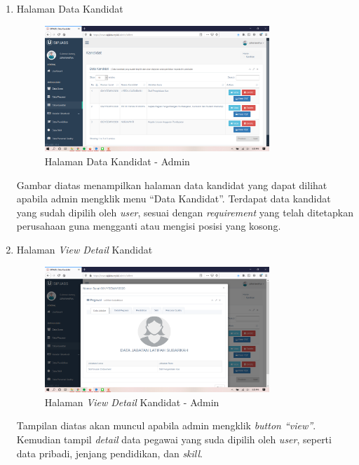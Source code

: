 \begin{enumerate}
	\newpage
		\item Halaman Data Kandidat
	\begin{figure}
		\centering
		\includegraphics[width=0.8\textwidth]
		{pics/admin/implementasi/datatallent.png}
		\caption{Halaman Data Kandidat - Admin}
		\label{fig:CC10}
	\end{figure}
	Gambar diatas menampilkan halaman data kandidat yang dapat dilihat apabila admin mengklik menu “Data Kandidat”. Terdapat data kandidat yang sudah dipilih oleh \textit{user}, sesuai dengan \textit{requirement} yang telah ditetapkan perusahaan guna mengganti atau mengisi posisi yang kosong.  
	
	\item Halaman \textit{View Detail} Kandidat
	\begin{figure}
		\centering
		\includegraphics[width=0.8\textwidth]
		{pics/admin/implementasi/viewdetailtallent.png}
		\caption{Halaman \textit{View Detail} Kandidat - Admin}
		\label{fig:CC10}
	\end{figure}
	Tampilan diatas akan muncul apabila admin mengklik \textit{button “view”}. Kemudian tampil \textit{detail} data pegawai yang suda dipilih oleh \textit{user}, seperti data pribadi, jenjang pendidikan, dan \textit{skill}. 
	

\end{enumerate}
